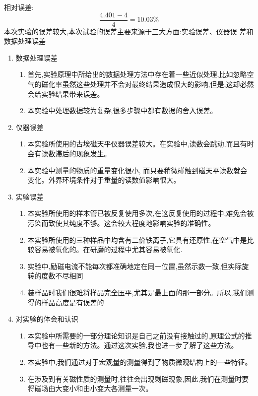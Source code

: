 \documentclass[11pt]{report}
\begin{document}
\begin{enumerate}
相对误差:
\[
\frac{4.401-4}{4}=10.03\%
\]
本次实验的误差较大,本次试验的误差主要来源于三大方面:实验误差、仪器误
差和数据处理误差
\begin{enumerate}
\item 数据处理误差
\label{sec:org13da091}
\begin{enumerate}
\item 首先,实验原理中所给出的数据处理方法中存在着一些近似处理,比如忽略空气的磁化率虽然这些处理并不会对最终结果造成很大的影响,但是,这却必然会给实验结果带来误差。
\item 本实验中处理数据较为复杂,很多步骤中都有数据的舍入误差。
\end{enumerate}
\item 仪器误差
\label{sec:orgaf20341}
\begin{enumerate}
\item 本实验所使用的古埃磁天平仪器误差较大。在实验中,读数会跳动,而且有时会有读数滞后的现象发生。
\item 本实验中测量的物质的重量变化很小, 而只要稍微碰触到磁天平读数就会变化。外界环境条件对于重量的读数值影响很大。
\end{enumerate}
\item 实验误差
\label{sec:orgad36527}
\begin{enumerate}
\item 本实验所使用的样本管已被反复使用多次,在这反复使用的过程中,难免会被污染而致使其纯度不够。这会较大程度地影响实验的准确性。
\item 本实验所使用的三种样品中均含有二价铁离子,它具有还原性,在空气中是比较容易被氧化的。在研磨的过程中尤其容易被氧化.
\item 实验中,励磁电流不能每次都准确地定在同一位置,虽然示数一致,但实际旋转的度数不尽相同
\item 装样品时我们很难将样品完全压平,尤其是最上面的那一部分。所以,我们测得的样品高度是有误差的
\end{enumerate}
\item 对实验的体会和认识
\label{sec:orge6b64fd}
\begin{enumerate}
\item 本实验中所需要的一部分理论知识是自己之前没有接触过的,原理公式的推导中也有一些新的方法。通过这次实验,我也进一步了解了这些方法。
\item 本实验中,我们通过对于宏观量的测量得到了物质微观结构上的一些特征。
\item 在涉及到有关磁性质的测量时,往往会出现剩磁现象,因此,我们在测量时要将磁场由大变小和由小变大各测量一次。
\end{enumerate}
\end{enumerate}
\end{enumerate}
\end{document}
